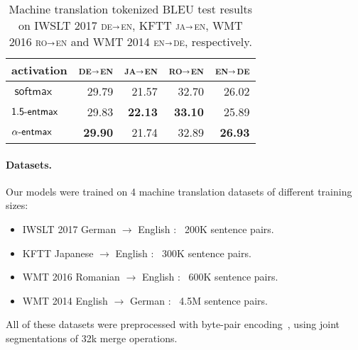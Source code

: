 \documentclass[11pt,a4paper]{article}
\DeclareMathOperator*{\softmax}{\mathsf{softmax}}
\newcommand*\entmaxtext{entmax\xspace}
\newcommand*\aentmax[1][\alpha]{\mathop{\mathsf{#1}\textnormal{-}\mathsf{\entmaxtext}}}
\newcommand{\langp}[2]{\textsc{#1}$\shortrightarrow$\textsc{#2}}
\begin{document}
\begin{table*}[ht]

    \begin{center}
    \small
    \begin{tabular}{lrrrr}
    \toprule
    activation
    & \langp{de}{en} & \langp{ja}{en}
    & \langp{ro}{en} & \langp{en}{de}\\
    \midrule
    $\softmax$
    & 29.79
    & 21.57
    & 32.70
    & 26.02 \\
    $\aentmax[1.5]$
    & 29.83
    & \textbf{22.13}
    & \textbf{33.10}
    & 25.89 \\
    $\aentmax[\alpha]$
    & \textbf{29.90}
    & 21.74
    & 32.89
    & \textbf{26.93} \\
    \bottomrule
    \end{tabular}
    \end{center}
    \caption{Machine translation tokenized BLEU test results
    on IWSLT 2017 \langp{de}{en},
    KFTT \langp{ja}{en}, WMT 2016 \langp{ro}{en} and
    WMT 2014 \langp{en}{de}, respectively.\label{table:mt}}
    \end{table*}

\paragraph{Datasets.} Our models were trained on 4 machine
translation datasets of different training sizes:

\begin{itemize}[itemsep=.5ex,leftmargin=2ex]
    \item IWSLT 2017 German $\rightarrow$ English
    \citep[\langp{de}{en},][]{cettolooverview}: ~200K sentence pairs.
    \item KFTT Japanese $\rightarrow$ English
    \citep[\langp{ja}{en},][]{neubig11kftt}: ~300K sentence pairs.
    \item WMT 2016 Romanian $\rightarrow$ English
    \citep[\langp{ro}{en},][]{bojar2016findings}: ~600K sentence pairs.
    \item WMT 2014 English $\rightarrow$ German
    \citep[\langp{en}{de},][]{bojar2014findings}: ~4.5M sentence pairs.
\end{itemize}

All of these datasets were preprocessed with byte-pair
encoding~\citep[BPE;][]{sennrich2016neural}, using joint
segmentations of 32k merge operations.
\end{document}
